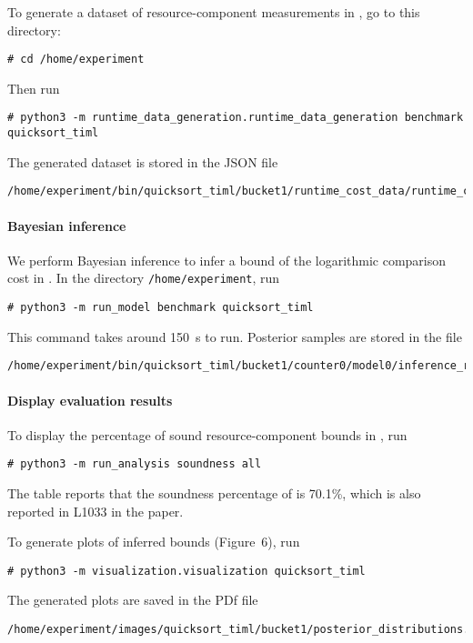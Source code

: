 To generate a dataset of resource-component measurements in \quicksorttiml{},
go to this directory:
\begin{verbatim}
# cd /home/experiment
\end{verbatim}
%
Then run
\begin{verbatim}
# python3 -m runtime_data_generation.runtime_data_generation benchmark quicksort_timl
\end{verbatim}
%
The generated dataset is stored in the JSON file
\begin{verbatim}
/home/experiment/bin/quicksort_timl/bucket1/runtime_cost_data/runtime_cost_data.json
\end{verbatim}

\paragraph{Bayesian inference}

We perform Bayesian inference to infer a bound of the logarithmic comparison cost in \quicksorttiml{}.
%
In the directory \texttt{/home/experiment}, run
\begin{verbatim}
# python3 -m run_model benchmark quicksort_timl
\end{verbatim}
%
This command takes around \qty{150}{\second} to run.
%
Posterior samples are stored in the file
\begin{verbatim}
/home/experiment/bin/quicksort_timl/bucket1/counter0/model0/inference_result.json
\end{verbatim}

\paragraph{Display evaluation results}

To display the percentage of sound resource-component bounds in
\quicksorttiml{}, run
\begin{verbatim}
# python3 -m run_analysis soundness all
\end{verbatim}
%
The table reports that the soundness percentage of \quicksorttiml{} is 70.1\%,
which is also reported in L1033 in the paper.

To generate plots of inferred bounds (Figure~6), run
\begin{verbatim}
# python3 -m visualization.visualization quicksort_timl
\end{verbatim}
%
The generated plots are saved in the PDf file
\begin{verbatim}
/home/experiment/images/quicksort_timl/bucket1/posterior_distributions.pdf
\end{verbatim}
